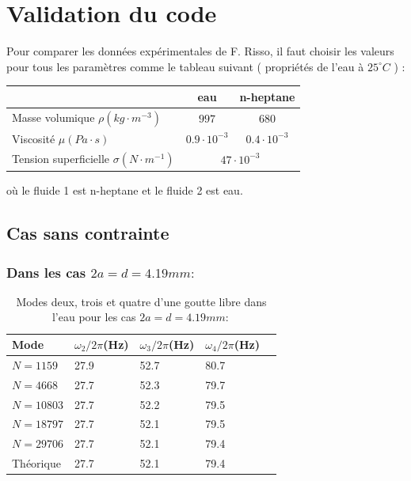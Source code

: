 \documentclass[a4paper]{report}
\begin{document}
\section{Validation du code}
Pour comparer les données expérimentales de F. Risso, il faut choisir les valeurs pour tous les paramètres comme le tableau suivant ( propriétés de l'eau à $25^{\circ}C$ ) :
\begin{center}
    \begin{tabular}{ | l | c | c | }
    \hline
                & eau & n-heptane \\
    \hline
    Masse volumique $\rho (kg \cdot m^{-3})$ & $997$ & $680$ \\ %
    \hline
    Viscosité $\mu (Pa \cdot s)$ & $0.9 \cdot 10^{-3}$ & $0.4 \cdot 10^{-3}$ \\ %
    \hline
    Tension superficielle $\sigma (N \cdot m^{-1})$ & \multicolumn{2}{c|}{$47 \cdot 10^{-3}$} \\ %
    \hline
    \end{tabular}
\end{center}
où le fluide 1 est n-heptane et le fluide 2 est eau.
\subsection{Cas sans contrainte}
\subsubsection{Dans les cas $2a = d = 4.19 mm :$}



\begin{table}[htp]

\begin{center}
    \begin{tabular}{ | l | l | l | l | l | }
    \hline
    Mode & $\omega_2/2\pi$(Hz) & $\omega_3/2\pi$(Hz) & $\omega_4/2\pi$(Hz) \\
    \hline
    $N = 1159$   & 27.9 & 52.7 & 80.7 \\ %
    \hline
    $N = 4668$   & 27.7 & 52.3 & 79.7 \\ %
    \hline
    $N = 10803$  & 27.7 & 52.2 & 79.5 \\ %
    \hline
    $N = 18797$  & 27.7 & 52.1 & 79.5 \\ %
    \hline
    $N = 29706$  & 27.7 & 52.1 & 79.4 \\ %
    \hline
    Théorique    & 27.7 & 52.1 & 79.4 \\
    \hline
    \end{tabular}
\end{center}
\caption{Modes deux, trois et quatre d'une goutte libre dans l'eau pour les cas $2a = d = 4.19 mm :$}
\end{table}
\end{document}
